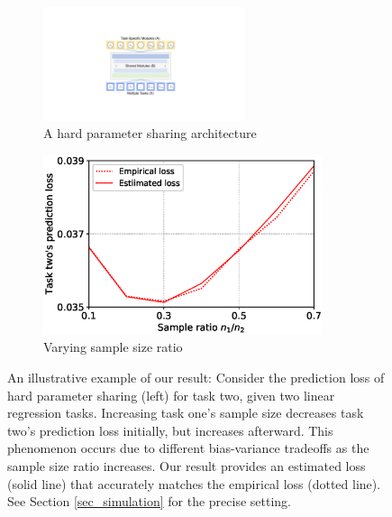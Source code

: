 \begin{figure}[!t]
	\begin{subfigure}[b]{0.5\textwidth}
		\centering
		\includegraphics[width=0.65\textwidth]{figures/mtl_model.pdf}
		\caption{A hard parameter sharing architecture}
	\end{subfigure}\hfill
	\begin{subfigure}[b]{0.5\textwidth}
		\centering
		\includegraphics[width=0.9\textwidth]{figures/sample_ratio_c2_400.eps}
		\caption{Varying sample size ratio}
		\label{fig_intro_sample_size_b}
	\end{subfigure}
	\caption{An illustrative example of our result:
	Consider the prediction loss of hard parameter sharing (left) for task two, given two linear regression tasks.
	Increasing task one's sample size decreases task two's prediction loss initially, but increases afterward. This phenomenon occurs due to different bias-variance tradeoffs as the sample size ratio increases. Our result provides an estimated loss (solid line) that accurately matches the empirical loss (dotted line).
	See Section \ref{sec_simulation} for the precise setting.}
	\label{fig_intro_sample_size}
\end{figure}

